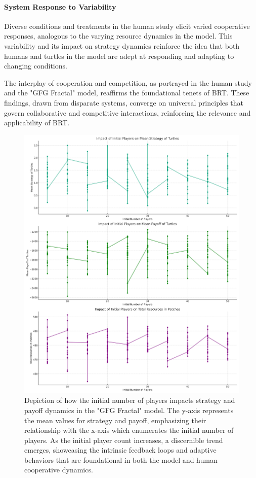\documentclass[sn-nature]{sn-jnl}%
\theoremstyle{thmstyleone}%
\theoremstyle{thmstyletwo}%
\theoremstyle{thmstylethree}%
\begin{document}
\paragraph{System Response to Variability}
Diverse conditions and treatments in the human study elicit varied cooperative responses, analogous to the varying resource dynamics in the model. This variability and its impact on strategy dynamics reinforce the idea that both humans and turtles in the model are adept at responding and adapting to changing conditions.

The interplay of cooperation and competition, as portrayed in the human study and the "GFG Fractal" model, reaffirms the foundational tenets of BRT. These findings, drawn from disparate systems, converge on universal principles that govern collaborative and competitive interactions, reinforcing the relevance and applicability of BRT.
\begin{figure}[H]
    \centering
    \includegraphics[width=1\linewidth]{initial_players_impact.png}
    \caption{Depiction of how the initial number of players impacts strategy and payoff dynamics in the "GFG Fractal" model. The y-axis represents the mean values for strategy and payoff, emphasizing their relationship with the x-axis which enumerates the initial number of players. As the initial player count increases, a discernible trend emerges, showcasing the intrinsic feedback loops and adaptive behaviors that are foundational in both the model and human cooperative dynamics.}

    \label{fig:enter-label}
\end{figure}
\end{document}
